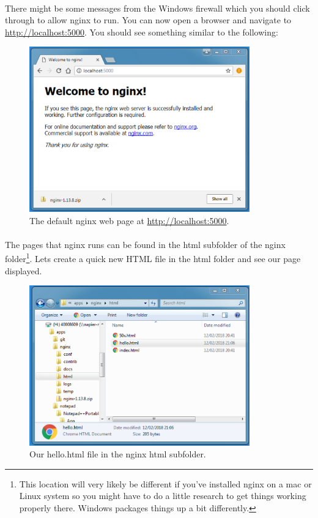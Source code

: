 \documentclass[10pt, a4paper, twosize]{article}
\begin{document}
\paragraph{} There might be some messages from the Windows firewall which you should click through to allow nginx to run. You can now open a browser and navigate to \url{http://localhost:5000}. You should see something similar to the following:

\begin{figure}[H]
\centering
\includegraphics[width=0.85\textwidth]{images/nginx_welcome}
\caption{The default nginx web page at \url{http://localhost:5000}.}
\label{fig:nginx_welcome}
\end{figure}

\paragraph{} The pages that nginx runs can be found in the html subfolder of the nginx folder\footnote{This location will very likely be different if you've installed nginx on a mac or Linux system so you might have to do a little research to get things working properly there. Windows packages things up a bit differently.}. Lets create a quick new HTML file in the html folder and see our page displayed. 

\begin{figure}[H]
\centering
\includegraphics[width=0.85\textwidth]{images/nginx_html}
\caption{Our hello.html file in the nginx html subfolder.}
\label{fig:nginx_welcome}
\end{figure}
\end{document}
